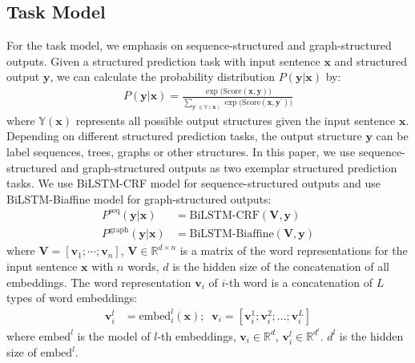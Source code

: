 \documentclass[11pt,a4paper]{article}
\def\vv{{\bm{v}}}
\def\vx{{\bm{x}}}
\def\vy{{\bm{y}}}
\def\mV{{\bm{V}}}
\def\sY{{\mathbb{Y}}}
\newcommand{\R}{\mathbb{R}}
\newcommand{\Score}{\text{Score}}
\begin{document}
\subsection{Task Model}
For the task model, we emphasis on sequence-structured and graph-structured outputs. Given a structured prediction task with input sentence $\vx$ and structured output $\vy$, we can calculate the probability distribution $P(\vy|\vx)$ by:
\begin{align}
P(\vy|\vx) = \frac{\exp{(\Score(\vx,\vy)})}{\sum_{\vy^{\prime} \in \sY(\vx)} \exp{(\Score(\vx,\vy^{\prime})})} \nonumber
\end{align}
where $\sY(\vx)$ represents all possible output structures given the input sentence $\vx$. Depending on different structured prediction tasks, the output structure $\vy$ can be label sequences, trees, graphs or other structures. In this paper, we use sequence-structured and graph-structured outputs as two exemplar structured prediction tasks. We use BiLSTM-CRF model \citep{ma-hovy-2016-end,lample-etal-2016-neural} for sequence-structured outputs and use BiLSTM-Biaffine model \citep{dozat2016deep} for graph-structured outputs:
\begin{align}
P^{\text{seq}}(\vy|\vx) &= \text{BiLSTM-CRF}(\mV,\vy)\nonumber\\
P^{\text{graph}}(\vy|\vx) &= \text{BiLSTM-Biaffine}(\mV,\vy)\nonumber
\end{align}
where $\mV = [\vv_1; \cdots; \vv_n]$, $\mV \in \R^{d\times n}$ is a matrix of the word representations for the input sentence $\vx$ with $n$ words, $d$ is the hidden size of the concatenation of all embeddings. The word representation $\vv_i$ of $i$-th word is a concatenation of $L$ types of word embeddings:
\begin{align}
\vv_i^l &= \text{embed}_i^l (\vx); \;\; \vv_i = [\vv_i^1;\vv_i^2; \dots; \vv_i^L] \nonumber
\end{align}
where $\text{embed}^l$ is the model of $l$-th embeddings, $\vv_i\in \R^d$, $\vv_i^l\in \R^{d^l}$. $d^l$ is the hidden size of $\text{embed}^l$. 
\end{document}
